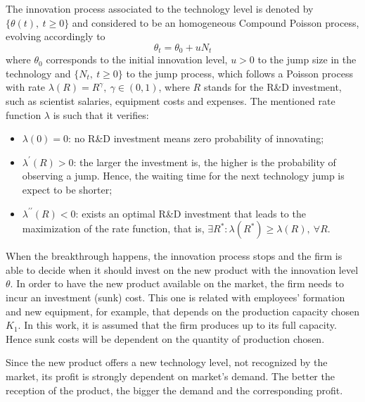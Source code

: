 The innovation process associated to the technology level is denoted by $\{ \theta(t), \ t \geq 0 \}$ and considered to be an homogeneous Compound Poisson process, evolving accordingly to
$$\theta_t= \theta_0+ u N_t$$  
where $\theta_0$ corresponds to the initial innovation level, $u > 0$ to the jump size in the technology and $\{N_t, \ t \geq 0\}$  to the jump process, which follows a Poisson process with rate $\lambda(R)=R^\gamma, \ \gamma \in (0,1)$, where $R$ stands for the R\&D investment, such as scientist salaries, equipment costs and expenses. The mentioned rate function $\lambda$ is such that it verifies:
\begin{itemize}
	\item $\lambda(0) = 0$: no R\&D investment means zero probability of innovating;
	\item $\lambda^\prime (R)>0$: the larger the investment is, the higher is the probability of observing a jump. Hence, the waiting time for the next technology jump is expect to be shorter;
	\item $ \lambda ^{ \prime \prime} (R)<0$: exists an optimal R\&D investment that leads to the maximization of the rate function, that is, $\exists R^*: \lambda(R^*)\geq \lambda(R), \  \forall R$.
\end{itemize}


When the breakthrough happens, the innovation process stops and the firm is able to decide when it should invest on the new product with the innovation level $\theta$. In order to have the new product available on the market, the firm needs to incur an investment (sunk) cost. This one is related with employees' formation and new equipment, for example, that depends on the production capacity chosen $K_1$. In this work, it is assumed that the firm produces up to its full capacity. Hence sunk costs will be dependent on the quantity of production chosen.

Since the new product offers a new technology level, not recognized by the market, its profit is strongly dependent on market's demand. The better the reception of the product, the bigger the demand and the corresponding profit.

